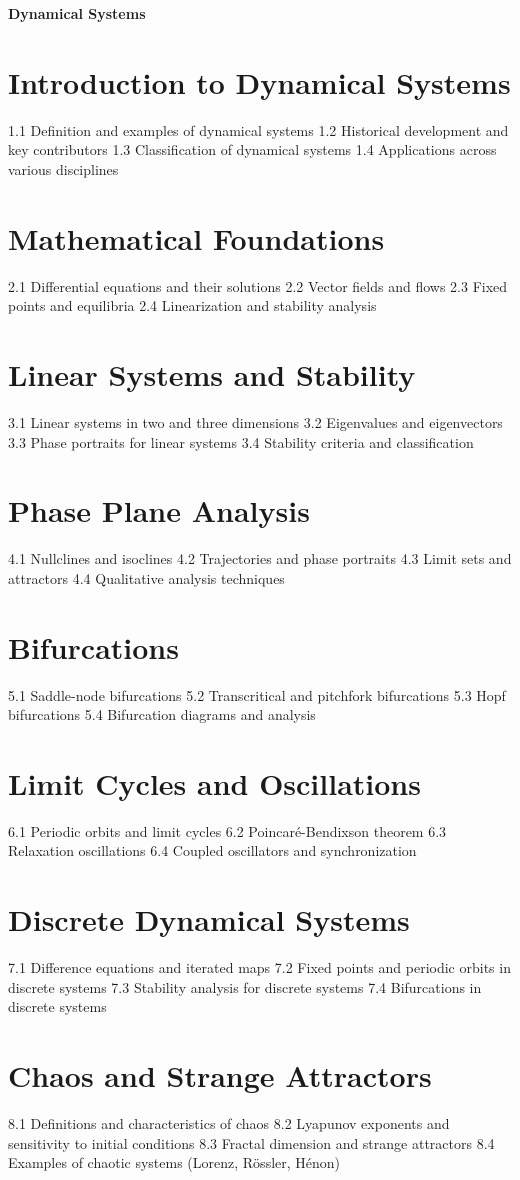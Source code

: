 {\LARGE \bf{Dynamical Systems}}
\section{Introduction to Dynamical Systems}
1.1 Definition and examples of dynamical systems
1.2 Historical development and key contributors
1.3 Classification of dynamical systems
1.4 Applications across various disciplines
\section{Mathematical Foundations}
2.1 Differential equations and their solutions
2.2 Vector fields and flows
2.3 Fixed points and equilibria
2.4 Linearization and stability analysis
\section{Linear Systems and Stability}
3.1 Linear systems in two and three dimensions
3.2 Eigenvalues and eigenvectors
3.3 Phase portraits for linear systems
3.4 Stability criteria and classification
\section{Phase Plane Analysis}
4.1 Nullclines and isoclines
4.2 Trajectories and phase portraits
4.3 Limit sets and attractors
4.4 Qualitative analysis techniques
\section{Bifurcations}
5.1 Saddle-node bifurcations
5.2 Transcritical and pitchfork bifurcations
5.3 Hopf bifurcations
5.4 Bifurcation diagrams and analysis
\section{Limit Cycles and Oscillations}
6.1 Periodic orbits and limit cycles
6.2 Poincaré-Bendixson theorem
6.3 Relaxation oscillations
6.4 Coupled oscillators and synchronization
\section{Discrete Dynamical Systems}
7.1 Difference equations and iterated maps
7.2 Fixed points and periodic orbits in discrete systems
7.3 Stability analysis for discrete systems
7.4 Bifurcations in discrete systems
\section{Chaos and Strange Attractors}
8.1 Definitions and characteristics of chaos
8.2 Lyapunov exponents and sensitivity to initial conditions
8.3 Fractal dimension and strange attractors
8.4 Examples of chaotic systems (Lorenz, Rössler, Hénon)
